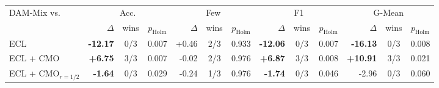 \begin{tabular}{lrccrccrccrcc}
\toprule
DAM-Mix vs. & \multicolumn{3}{c}{Acc.} & \multicolumn{3}{c}{Few} & \multicolumn{3}{c}{F1} & \multicolumn{3}{c}{G-Mean} \\
 & $\Delta$ & wins & $p_{\mathrm{Holm}}$ & $\Delta$ & wins & $p_{\mathrm{Holm}}$ & $\Delta$ & wins & $p_{\mathrm{Holm}}$ & $\Delta$ & wins & $p_{\mathrm{Holm}}$ \\
\midrule
ECL & \textbf{-12.17} & 0/3 & 0.007 & +0.46 & 2/3 & 0.933 & \textbf{-12.06} & 0/3 & 0.007 & \textbf{-16.13} & 0/3 & 0.008 \\
ECL + CMO & \textbf{+6.75} & 3/3 & 0.007 & -0.02 & 2/3 & 0.976 & \textbf{+6.87} & 3/3 & 0.008 & \textbf{+10.91} & 3/3 & 0.021 \\
ECL + CMO$_{r=1/2}$ & \textbf{-1.64} & 0/3 & 0.029 & -0.24 & 1/3 & 0.976 & \textbf{-1.74} & 0/3 & 0.046 & -2.96 & 0/3 & 0.060 \\
\bottomrule
\end{tabular}
